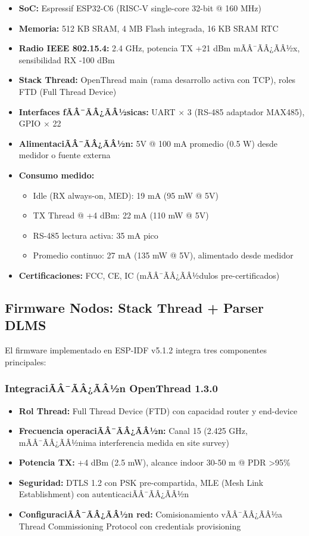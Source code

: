 \begin{itemize}
    \item \textbf{SoC:} Espressif ESP32-C6 (RISC-V single-core 32-bit @ 160 MHz)
    \item \textbf{Memoria:} 512 KB SRAM, 4 MB Flash integrada, 16 KB SRAM RTC
    \item \textbf{Radio IEEE 802.15.4:} 2.4 GHz, potencia TX +21 dBm mÃÂ¯ÃÂ¿ÃÂ½x, sensibilidad RX -100 dBm
    \item \textbf{Stack Thread:} OpenThread main (rama desarrollo activa con TCP), roles FTD (Full Thread Device)
    \item \textbf{Interfaces fÃÂ¯ÃÂ¿ÃÂ½sicas:} UART $\times$ 3 (RS-485 adaptador MAX485), GPIO $\times$ 22
    \item \textbf{AlimentaciÃÂ¯ÃÂ¿ÃÂ½n:} 5V @ 100 mA promedio (0.5 W) desde medidor o fuente externa
    \item \textbf{Consumo medido:} 
        \begin{itemize}
        \item Idle (RX always-on, MED): 19 mA (95 mW @ 5V)
        \item TX Thread @ +4 dBm: 22 mA (110 mW @ 5V)
        \item RS-485 lectura activa: 35 mA pico
        \item Promedio continuo: 27 mA (135 mW @ 5V), alimentado desde medidor
        \end{itemize}
    \item \textbf{Certificaciones:} FCC, CE, IC (mÃÂ¯ÃÂ¿ÃÂ½dulos pre-certificados)
\end{itemize}

\subsection{Firmware Nodos: Stack Thread + Parser DLMS}
\label{sec:impl-firmware-nodos}

El firmware implementado en ESP-IDF v5.1.2 integra tres componentes principales:

\subsubsection{IntegraciÃÂ¯ÃÂ¿ÃÂ½n OpenThread 1.3.0}

\begin{itemize}
\item \textbf{Rol Thread:} Full Thread Device (FTD) con capacidad router y end-device
\item \textbf{Frecuencia operaciÃÂ¯ÃÂ¿ÃÂ½n:} Canal 15 (2.425 GHz, mÃÂ¯ÃÂ¿ÃÂ½nima interferencia medida en site survey)
\item \textbf{Potencia TX:} +4 dBm (2.5 mW), alcance indoor 30-50 m @ PDR >95\%
\item \textbf{Seguridad:} DTLS 1.2 con PSK pre-compartida, MLE (Mesh Link Establishment) con autenticaciÃÂ¯ÃÂ¿ÃÂ½n
\item \textbf{ConfiguraciÃÂ¯ÃÂ¿ÃÂ½n red:} Comisionamiento vÃÂ¯ÃÂ¿ÃÂ½a Thread Commissioning Protocol con credentials provisioning
\end{itemize}

